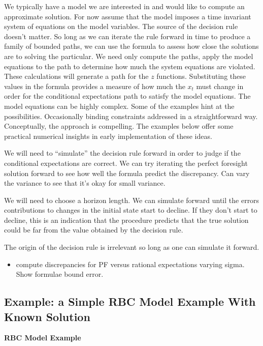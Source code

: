 \documentclass[12pt]{article}
\begin{document}
We typically have a model we are interested in and would like to compute an approximate solution.  For now assume that the model imposes a time invariant system of equations on the model variables.
The source of the decision rule doesn't matter.  So long as we can iterate the
rule forward in time to produce a family of bounded paths, we can use the
formula to assess how close the solutions are to solving the particular.
We need only compute the paths, apply the model equations to the path to determine how much the system equations are violated.  These calculations will 
generate a path for the $z$ functions.  Substituting these values in the
formula provides a measure of how much the $x_t$ must change in order for the conditional expectations path to satisfy the model equations.
The model equations can be highly complex. Some of the examples hint at the 
possibilities. Occasionally binding constraints addressed in a straightforward 
way.  Conceptually, the approach is compelling.  The examples below
offer some practical numerical insights in early implementation of these
ideas.



We will need to ``simulate'' the decision rule forward in order to judge if the conditional expectations are correct.
We can try iterating the perfect foresight solution forward to see how well the formula predict the discrepancy.  Can vary the variance to see that it's okay for small variance.

We will need to choose a horizon length. We can simulate forward until the errors contributions to changes in the initial state start to decline.
If they don't start to decline, this is an indication that the procedure 
predicts that the true solution could be far from the value obtained by the
decision rule.

The origin of the decision rule is irrelevant so long as one can simulate it 
forward.

\begin{itemize}
\item compute discrepancies for PF versus rational expectations varying sigma.
Show formulae bound error.
\end{itemize}


\subsection{Example: a Simple RBC Model Example With Known Solution}
\label{sec:simple-rbc-model-2}


 {\bf RBC Model Example}
  
\end{document}
